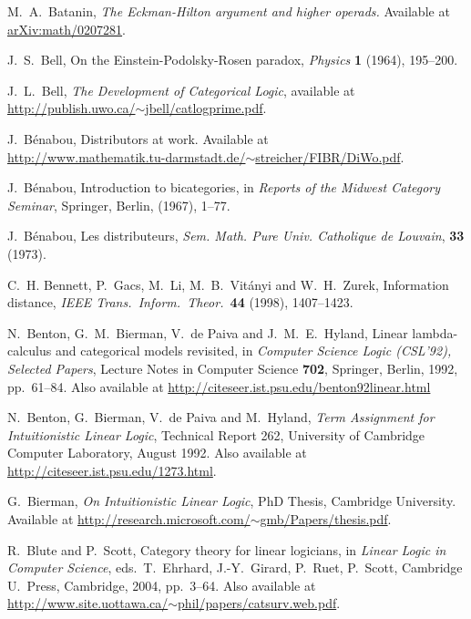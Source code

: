 \documentclass[12pt,twoside,openright]{report}
\begin{document}
\begin{thebibliography}{99}
M.\ A.\ Batanin, {\sl The Eckman-Hilton argument and higher operads.}  Available at
\href{http://arxiv.org/abs/math/0207281}{arXiv:math/0207281}.

 J.\ S.\ Bell, On the Einstein-Podolsky-Rosen paradox, {\sl Physics} {\bf 1} (1964), 195--200.

 J.\ L.\ Bell, {\sl The Development of Categorical Logic}, available at \hfill \break
\href{http://publish.uwo.ca/~jbell/catlogprime.pdf}{http://publish.uwo.ca/$\sim$jbell/catlogprime.pdf}.

 J.\ B{\'e}nabou, Distributors at work. Available at \\
\href{http://www.mathematik.tu-darmstadt.de/~streicher/FIBR/DiWo.pdf}{http://www.mathematik.tu-darmstadt.de/$\sim$streicher/FIBR/DiWo.pdf}.

 J.\ B{\'e}nabou, Introduction to bicategories, in \textsl{Reports of the Midwest Category Seminar}, Springer, Berlin, (1967), 1--77.

 J.\ B{\'e}nabou, Les distributeurs, \textsl{Sem. Math. Pure Univ. Catholique de Louvain}, \textbf{33} (1973).

 C.\ H. Bennett, P.\ Gacs, M.\ Li, M.\ B.\ Vit\'anyi and W.\ H.\ Zurek, Information distance, \textit{IEEE Trans.\ 
Inform.\ Theor.\ }\textbf{44} (1998), 1407--1423.

 N.\ Benton, G.\ M.\ Bierman, V.\ de Paiva and J.\ M.\ E.\
Hyland, Linear lambda-calculus and categorical models revisited, in
{\sl Computer Science Logic (CSL'92), Selected Papers}, Lecture Notes in Computer Science {\bf 702}, Springer, Berlin, 1992, pp.\ 61--84. Also available at
\href{http://citeseer.ist.psu.edu/benton92linear.html}
{http://citeseer.ist.psu.edu/benton92linear.html}

 N.\ Benton, G.\ Bierman, V.\ de Paiva and M.\ Hyland,
{\sl Term Assignment for Intuitionistic Linear Logic}, Technical Report 262, University of Cambridge Computer Laboratory, August 1992. Also available at \href{http://citeseer.ist.psu.edu/1273.html}
{http://citeseer.ist.psu.edu/1273.html}.

 G.\ Bierman, {\sl On Intuitionistic Linear Logic}, PhD Thesis, Cambridge University.  Available at 
\href{http://research.microsoft.com/~gmb/Papers/thesis.pdf}
{http://research.microsoft.com/$\sim$gmb/Papers/thesis.pdf}.

 R.\ Blute and P.\ Scott, Category theory for linear logicians, in {\sl Linear Logic in Computer Science}, eds.\
T.\ Ehrhard, J.-Y.\ Girard, P.\ Ruet, P.\ Scott, Cambridge U.\ Press, Cambridge, 2004, pp.\ 3--64.  Also available at 
\href{http://www.site.uottawa.ca/~phil/papers/catsurv.web.pdf}
{http://www.site.uottawa.ca/$\sim$phil/papers/catsurv.web.pdf}.


\end{thebibliography}
\end{document}
